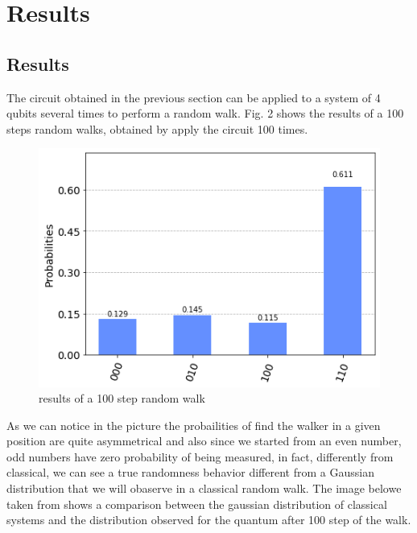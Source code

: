 \section{Results}

\subsection{Results}

The circuit obtained in the previous section can be applied to a system of 4 qubits several times to perform a random walk. 
Fig. 2 shows the results of a 100 steps random walks, obtained by apply the circuit 100 times. 

\begin{figure}[h!]
    \includegraphics[scale=0.4]{img/100_steps_walk.png}
    \caption{results of a 100 step random walk}
    \centering
\end{figure}

As we can notice in the picture the probailities of find the walker in a given position are 
quite asymmetrical and also since we started from an even number, odd numbers have zero probability of 
being measured, in fact, differently from classical, we can 
see a true randomness behavior different from a Gaussian distribution that we will obaserve in a 
classical random walk. The image belowe taken from \cite{Kendon2004} shows a comparison between
the gaussian distribution of classical systems and the distribution observed for the quantum after 
100 step of the walk.

